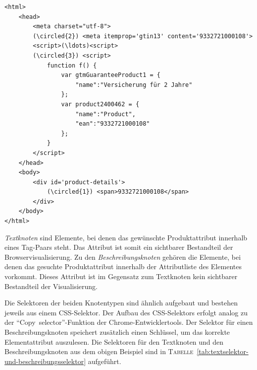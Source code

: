 \vspace{0.25cm}
\begin{minipage}[c]{\textwidth} %
    \vspace{0.5cm}
    \begin{lstlisting}[label={code:examples}]
<html>
    <head>
        <meta charset="utf-8">
        (\circled{2}) <meta itemprop='gtin13' content='9332721000108'>
        <script>(\ldots)<script>
        (\circled{3}) <script>
            function f() {
                var gtmGuaranteeProduct1 = {
                    "name":"Versicherung für 2 Jahre"
                };
                var product2400462 = {
                    "name":"Product",
                    "ean":"9332721000108"
                };
            }
        </script>
    </head>
    <body>
        <div id='product-details'>
            (\circled{1}) <span>9332721000108</span>
        </div>
    </body>
</html>
    \end{lstlisting}
    \vspace{0.5cm}
\end{minipage}

\textit{Textknoten} sind Elemente, bei denen das gewünschte Produktattribut innerhalb eines Tag-Paars steht.
Das Attribut ist somit ein sichtbarer Bestandteil der Browservisualisierung.
Zu den \textit{Beschreibungsknoten} gehören die Elemente, bei denen das gesuchte Produktattribut innerhalb der
Attributliste des Elementes vorkommt.
Dieses Attribut ist im Gegensatz zum Textknoten kein sichtbarer Bestandteil der Visualisierung.

Die Selektoren der beiden Knotentypen sind ähnlich aufgebaut und bestehen jeweils aus einem CSS-Selektor.
Der Aufbau des CSS-Selektors erfolgt analog zu der ``Copy~selector''-Funktion der Chrome-Entwicklertools.
Der Selektor für einen Beschreibungsknoten speichert zusätzlich einen Schlüssel, um das korrekte Elementattribut
auszulesen.
Die Selektoren für den Textknoten und den Beschreibungsknoten aus dem obigen Beispiel sind in
\textsc{Tabelle}~\ref{tab:textselektor-und-beschreibungsselektor} aufgeführt.

